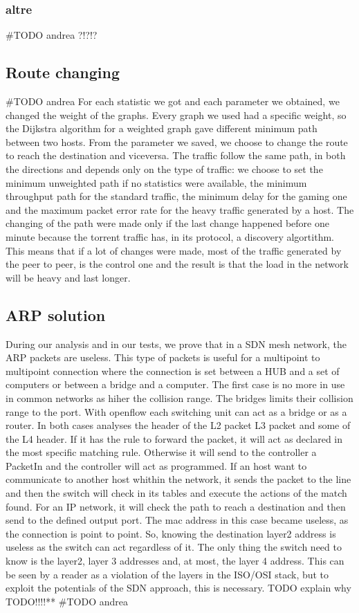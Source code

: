 \documentclass[conference,10pt]{IEEEtran}
\begin{document}
    \subsubsection{altre}
    \#TODO andrea ?!?!?

  \subsection{Route changing} %
  \#TODO andrea
	For each statistic we got and each parameter we obtained, we changed the weight of the graphs. Every graph we used had a specific weight, so the
	Dijkstra algorithm for a weighted graph gave different minimum path between two hosts. From the parameter we saved, we choose to change the
	route to reach the destination and viceversa. The traffic follow the same path, in both the directions and depends only on the type of traffic:
	we choose to set the minimum unweighted path if no statistics were available, the minimum throughput path for the standard traffic, the minimum
	delay for the gaming one and the maximum packet error rate for the heavy traffic generated by a host.
	The changing of the path were made only if the last change happened before one minute because the torrent traffic has, in its protocol, a discovery
	algortithm. This means that if a lot of changes were made, most of the traffic generated by the peer to peer, is the control one and the result is that the
	load in the network will be heavy and last longer.

  \subsection{ARP solution} %
  During our analysis and in our tests, we prove that in a SDN mesh network, the ARP packets are useless.
  This type of packets is useful for a multipoint to multipoint connection where the connection is set between a
  HUB and a set of computers or between a bridge and a computer. The first case is no more in use in common networks as
  hiher the collision range. The bridges limits their collision range to the port. With openflow each switching unit can
  act as a bridge or as a router. In both cases analyses the header of the L2 packet L3 packet and some of the L4 header.
  If it has the rule to forward the packet, it will act as declared in the most specific matching rule. Otherwise it will
  send to the controller a PacketIn and the controller will act as programmed. If an host want to communicate to another host whithin
  the network, it sends the packet to the line and then the switch will check in its tables and execute the actions of the match found.
  For an IP network, it will check the path to reach a destination and then send to the defined output port. The mac address in this case
  became useless, as the connection is point to point. So, knowing the destination layer2 address is useless as the switch can act
  regardless of it. The only thing the switch need to know is the layer2, layer 3 addresses and, at most, the layer 4 address.
  This can be seen by a reader as a violation of the layers in the ISO/OSI stack, but to exploit the potentials of the SDN approach,
  this is necessary. TODO explain why TODO!!!!**
  \#TODO andrea
\end{document}
